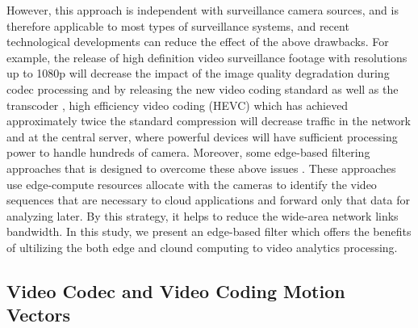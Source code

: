 However, this approach is independent with surveillance camera sources, and is therefore applicable to most types of surveillance systems, and recent technological developments can reduce the effect of the above drawbacks. For example, the release of high definition video surveillance footage with resolutions up to 1080p will decrease the impact of the image quality degradation during codec processing and by releasing the new video coding standard as well as the transcoder \cite{thanh2019efficient}, high efficiency video coding (HEVC)\cite{sullivan2012overview} which has achieved approximately twice the standard compression\cite{ohm2012comparison} will decrease traffic in the network and at the central server, where powerful devices will have sufficient processing power to handle hundreds of camera. Moreover, some edge-based filtering approaches that
is designed to overcome these above issues \cite{canel2019scaling}\cite{li2020reducto}\cite{chen2015glimpse}. These approaches use edge-compute resources allocate with the cameras to identify the video sequences that are necessary to cloud applications and forward only that data for analyzing later. By this strategy, it helps to reduce the wide-area network links bandwidth. In this study, we present an edge-based filter which offers the benefits of ultilizing the both edge  and clound computing to video analytics processing.
\subsection{Video Codec and Video Coding Motion Vectors}
